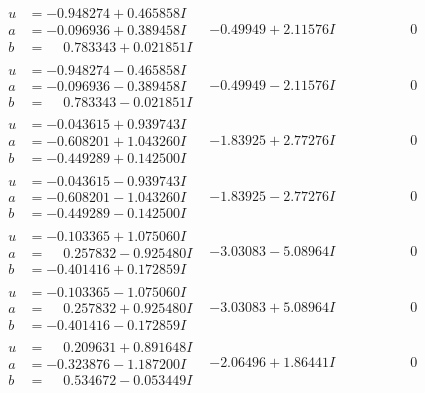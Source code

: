 \documentclass[1p]{elsarticle_modified}
\theoremstyle{definition}
\begin{document}
$$\begin{array}{c|c|c}
\begin{aligned}
u &= -0.948274 + 0.465858 I \\
a &= -0.096936 + 0.389458 I \\
b &= \phantom{-}0.783343 + 0.021851 I\end{aligned}
 & -0.49949 + 2.11576 I & \phantom{-0.000000 } 0 \\ \hline\begin{aligned}
u &= -0.948274 - 0.465858 I \\
a &= -0.096936 - 0.389458 I \\
b &= \phantom{-}0.783343 - 0.021851 I\end{aligned}
 & -0.49949 - 2.11576 I & \phantom{-0.000000 } 0 \\ \hline\begin{aligned}
u &= -0.043615 + 0.939743 I \\
a &= -0.608201 + 1.043260 I \\
b &= -0.449289 + 0.142500 I\end{aligned}
 & -1.83925 + 2.77276 I & \phantom{-0.000000 } 0 \\ \hline\begin{aligned}
u &= -0.043615 - 0.939743 I \\
a &= -0.608201 - 1.043260 I \\
b &= -0.449289 - 0.142500 I\end{aligned}
 & -1.83925 - 2.77276 I & \phantom{-0.000000 } 0 \\ \hline\begin{aligned}
u &= -0.103365 + 1.075060 I \\
a &= \phantom{-}0.257832 - 0.925480 I \\
b &= -0.401416 + 0.172859 I\end{aligned}
 & -3.03083 - 5.08964 I & \phantom{-0.000000 } 0 \\ \hline\begin{aligned}
u &= -0.103365 - 1.075060 I \\
a &= \phantom{-}0.257832 + 0.925480 I \\
b &= -0.401416 - 0.172859 I\end{aligned}
 & -3.03083 + 5.08964 I & \phantom{-0.000000 } 0 \\ \hline\begin{aligned}
u &= \phantom{-}0.209631 + 0.891648 I \\
a &= -0.323876 - 1.187200 I \\
b &= \phantom{-}0.534672 - 0.053449 I\end{aligned}
 & -2.06496 + 1.86441 I & \phantom{-0.000000 } 0 \\ \hline\begin{aligned}

\end{aligned}
\end{array}$$
\end{document}
